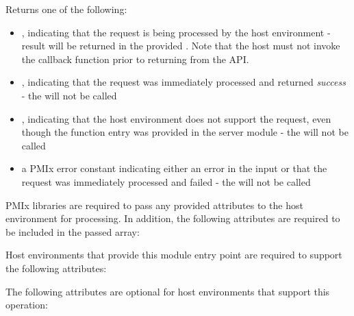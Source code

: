 Returns one of the following:

\begin{itemize}
    \item {}, indicating that the request is being processed by the host environment - result will be returned in the provided . Note that the host must not invoke the callback function prior to returning from the \ac{API}.
    \item {}, indicating that the request was immediately processed and returned \textit{success} - the  will not be called
    \item {}, indicating that the host environment does not support the request, even though the function entry was provided in the server module - the  will not be called
    \item a PMIx error constant indicating either an error in the input or that the request was immediately processed and failed - the  will not be called
\end{itemize}

\reqattrstart
\ac{PMIx} libraries are required to pass any provided attributes to the host environment for processing. In addition, the following attributes are required to be included in the passed  array:


\divider

Host environments that provide this module entry point are required to support the following attributes:


\reqattrend

\optattrstart
The following attributes are optional for host environments that support this operation:


\optattrend

\descr

